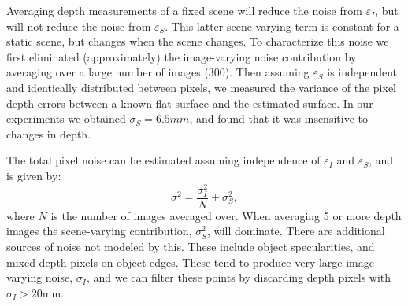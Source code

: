 Averaging depth measurements of a fixed scene will reduce the noise from $\varepsilon_I$, but will not reduce the noise from $\varepsilon_S$.  This latter scene-varying term is constant for a static scene, but changes when the scene changes.  To characterize this noise we first eliminated (approximately) the image-varying noise contribution by averaging over a large number of images (300).  Then assuming $\varepsilon_S$ is independent and identically distributed between pixels, we measured the variance of the pixel depth errors between a known flat surface and the estimated surface.  In our experiments we obtained $\sigma_S=6.5mm$, and found that it was insensitive to changes in depth.

The total pixel noise can be estimated assuming independence of $\varepsilon_I$ and $\varepsilon_S$, and is given by:
\begin{equation}
\sigma^2 = \frac{\sigma_I^2}{N} + \sigma_S^2,\label{eq:sigma}
\end{equation}
where $N$ is the number of images averaged over.  When averaging 5 or more depth images the scene-varying contribution, $\sigma_S^2$, will dominate.  There are additional sources of noise not modeled by this.  These include object specularities, and mixed-depth pixels on object edges.  These tend to produce very large image-varying noise, $\sigma_I$, and we can filter these points by discarding depth pixels with $\sigma_I>20$mm.  



